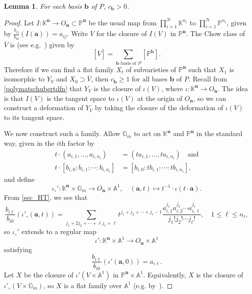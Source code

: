 \documentclass[11pt]{article}
\newtheorem{lemm}[theo]{Lemma}
\theoremstyle{definition}
\numberwithin{equation}{section}
\renewcommand{\P}{\mathbb{P}}
\newcommand{\A}{\mathbb{A}}
\newcommand{\Gm}{\mathbb{G}_m}
\newcommand{\G}{\mathbb{G}}
\newcommand{\K}{\mathbb{K}}
\newcommand{\revision}[1]{{#1}}
\begin{document}
\begin{lemm}\label{chowclass:positivity}
  \revision{For each basis $\mathbf b$ of $P$, $c_{\mathbf b} > 0$.}
\end{lemm}
\begin{proof}
  Let $I: \K^{\mathbf n} \to O_{\mathbf n} \subset \P^{\mathbf{n}}$ be the usual map from $\prod_{i=1}^N \K^{n_i}$ to $\prod_{i=1}^N\P^{n_i}$, given by $\frac{b_{ij}}{b_{i0}}(I(\mathbf a)) = a_{ij}$.
  Write $\overline V$ for the closure of $I(V)$ in $\P^{\mathbf n}$. The Chow class of $\overline V$ is (see e.g.~\cite{CFCYL20}) given by
  \[
    [\overline V] = \sum_{\text{$\mathbf b$ basis of $P$}} [\P^{\mathbf b}].
  \]
  Therefore if we can find a flat family $X_t$ of subvarieties of $\P^{\mathbf{n}}$ such that $X_1$ is isomorphic to $Y_V$ and $X_0 \supset \overline V$, then $c_{\mathbf b} \geq 1$ for all bases $\mathbf b$ of $P$.   Recall from \cref{polymatschubertdfn} that $Y_V$ is the closure of $\iota(V)$, where $\iota: \K^{\mathbf n} \to O_{\mathbf n}$. The idea is that $I(V)$ is the tangent space to $\iota(V)$ at the origin of $O_{\mathbf{n}}$, so we can construct a deformation of $Y_V$ by taking the closure of the deformation of $\iota(V)$ to its tangent space. 
  

  We now construct such a family. Allow $\G_m$ to act on $\K^{\mathbf n}$ and $\P^{\mathbf n}$ in the standard way, given in the $i$th factor by
  \begin{align*}
    t \cdot (a_{i,1},\ldots, a_{i,n_i}) &= (t a_{i,1}, \ldots, t a_{i,n_i}) \quad \text{and} \\
    t \cdot [b_{i,0}: b_{i,1}: \cdots : b_{i,n_i}] &= [b_{i,0}: t b_{i,1} : \cdots : t b_{i,n_i}],
  \end{align*}
  and define
  \[
    \iota_\circ': \K^{\mathbf n} \times \Gm \to O_{\mathbf n} \times \A^1, \quad (\mathbf a, t) \mapsto t^{-1} \cdot \iota(t \cdot \mathbf a).
  \]
  From \cref{sec_HT}, we see that
\revision{  \[
    \frac{b_{i\ell}}{b_{i0}}(\iota'_\circ(\mathbf a, t)) = \sum_{j_1+2j_2 + \cdots + \ell j_\ell = \ell} t^{j_1+j_2+\cdots+j_\ell - 1} \frac{a_{i,1}^{j_1} a_{i,2}^{j_2} \cdots a_{i,\ell}^{j_\ell}}{j_1! j_2! \cdots j_\ell!}, \quad 1 \leq \ell \leq n_i,
  \]}
  so $\iota_\circ'$ extends to a regular map
  \[
    \iota': \K^{\mathbf n} \times \A^1 \to O_{\mathbf n} \times \A^1
  \]
  satisfying
  \[
    \frac{b_{i\ell}}{b_{i0}}(\iota'(\mathbf a, 0)) = a_{i\ell}.
  \]
  Let $X$ be the closure of $\iota'(V \times \A^1)$ in $\P^{\mathbf n} \times \A^1$. \revision{Equivalently, $X$ is the closure of $\iota'_\circ(V \times \G_m)$, so $X$ is a flat family over $\A^1$ (e.g. by~\cite[Proposition 4.3.9]{liu}).}


\end{proof}
\end{document}
